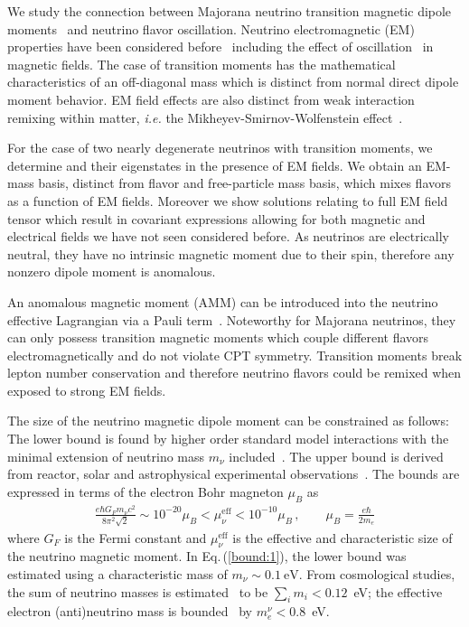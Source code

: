 \documentclass{ws-ijmpa}
\newcommand{\req}[1]{Eq.\,(\ref{#1})}
\begin{document}
We study the connection between Majorana neutrino transition magnetic dipole moments~\cite{Fujikawa:1980yx,Shrock:1980vy,Shrock:1982sc} and neutrino flavor oscillation. Neutrino electromagnetic (EM) properties have been considered before~\cite{Schechter:1981hw,Giunti:2014ixa,Popov:2019nkr,Chukhnova:2019oum} including the effect of oscillation~\cite{Lim:1987tk,Akhmedov:1988uk,Pal:1991pm,Elizalde:2004mw,Akhmedov:2022txm} in magnetic fields. The case of transition moments has the mathematical characteristics of an off-diagonal mass which is distinct from normal direct dipole moment behavior. EM field effects are also distinct from weak interaction remixing within matter, {\it i.e.\/} the Mikheyev-Smirnov-Wolfenstein effect~\cite{Wolfenstein:1977ue,Mikheyev:1985zog,Smirnov:2003da}.

For the case of two nearly degenerate neutrinos with transition moments, we determine and their eigenstates in the presence of EM fields. We obtain an EM-mass basis, distinct from flavor and free-particle mass basis, which mixes flavors as a function of EM fields. Moreover we show solutions relating to full EM field tensor which result in covariant expressions allowing for both magnetic and electrical fields we have not seen considered before. As neutrinos are electrically neutral, they have no intrinsic magnetic moment due to their spin, therefore any nonzero dipole moment is anomalous.

An anomalous magnetic moment (AMM) can be introduced into the neutrino effective Lagrangian via a Pauli term~\cite{Steinmetz:2018ryf,Itzykson:1980rh,Schwartz:2014sze}. Noteworthy for Majorana neutrinos, they can only possess transition magnetic moments which couple different flavors electromagnetically and do not violate CPT symmetry. Transition moments break lepton number conservation and therefore neutrino flavors could be remixed when exposed to strong EM fields.

The size of the neutrino magnetic dipole moment can be constrained as follows: The lower bound is found by higher order standard model interactions with the minimal extension of neutrino mass $m_{\nu}$ included~\cite{Fujikawa:1980yx,Shrock:1980vy,Shrock:1982sc}. The upper bound is derived from reactor, solar and astrophysical experimental observations~\cite{Giunti:2015gga,Canas:2015yoa,Studenikin:2016ykv,AristizabalSierra:2021fuc}. The bounds are expressed in terms of the electron Bohr magneton $\mu_{B}$ as
\begin{align}
\label{bound:1}
\frac{e\hbar G_{F}m_{\nu}c^{2}}{8\pi^{2}\sqrt{2}} \sim 10^{-20}\mu_{B}<\mu_{\nu}^\mathrm{eff}<10^{-10}\mu_{B}\,,\qquad\mu_{B}=\frac{e\hbar}{2m_{e}}
\end{align}
where $G_{F}$ is the Fermi constant and $\mu_{\nu}^\mathrm{eff}$ is the effective and characteristic size of the neutrino magnetic moment. In \req{bound:1}, the lower bound was estimated using a characteristic mass of $m_{\nu}\sim0.1~\mathrm{eV}$. From cosmological studies, the sum of neutrino masses is estimated~\cite{Planck:2018vyg} to be $\sum_{i}m_{i}<0.12$~eV; the effective electron (anti)neutrino mass is bounded~\cite{KATRIN:2021uub} by $m_{e}^{\nu}<0.8$~eV.
\end{document}
